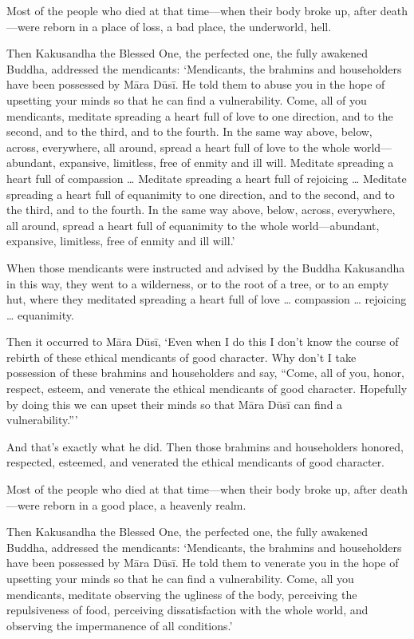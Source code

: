 \documentclass[12pt,openany]{book}%
\begin{document}
Most of the people who died at that time—when their body broke up, after death—were reborn in a place of loss, a bad place, the underworld, hell. 

Then Kakusandha the Blessed One, the perfected one, the fully awakened Buddha, addressed the mendicants: ‘Mendicants, the brahmins and householders have been possessed by \textsanskrit{Māra} \textsanskrit{Dūsī}. He told them to abuse you in the hope of upsetting your minds so that he can find a vulnerability. Come, all of you mendicants, meditate spreading a heart full of love to one direction, and to the second, and to the third, and to the fourth. In the same way above, below, across, everywhere, all around, spread a heart full of love to the whole world—abundant, expansive, limitless, free of enmity and ill will. Meditate spreading a heart full of compassion … Meditate spreading a heart full of rejoicing … Meditate spreading a heart full of equanimity to one direction, and to the second, and to the third, and to the fourth. In the same way above, below, across, everywhere, all around, spread a heart full of equanimity to the whole world—abundant, expansive, limitless, free of enmity and ill will.’ 

When those mendicants were instructed and advised by the Buddha Kakusandha in this way, they went to a wilderness, or to the root of a tree, or to an empty hut, where they meditated spreading a heart full of love … compassion … rejoicing … equanimity. 

Then it occurred to \textsanskrit{Māra} \textsanskrit{Dūsī}, ‘Even when I do this I don’t know the course of rebirth of these ethical mendicants of good character. Why don’t I take possession of these brahmins and householders and say, “Come, all of you, honor, respect, esteem, and venerate the ethical mendicants of good character. Hopefully by doing this we can upset their minds so that \textsanskrit{Māra} \textsanskrit{Dūsī} can find a vulnerability.”’ 

And that’s exactly what he did. Then those brahmins and householders honored, respected, esteemed, and venerated the ethical mendicants of good character. 

Most of the people who died at that time—when their body broke up, after death—were reborn in a good place, a heavenly realm. 

Then Kakusandha the Blessed One, the perfected one, the fully awakened Buddha, addressed the mendicants: ‘Mendicants, the brahmins and householders have been possessed by \textsanskrit{Māra} \textsanskrit{Dūsī}. He told them to venerate you in the hope of upsetting your minds so that he can find a vulnerability. Come, all you mendicants, meditate observing the ugliness of the body, perceiving the repulsiveness of food, perceiving dissatisfaction with the whole world, and observing the impermanence of all conditions.’ 
\end{document}
